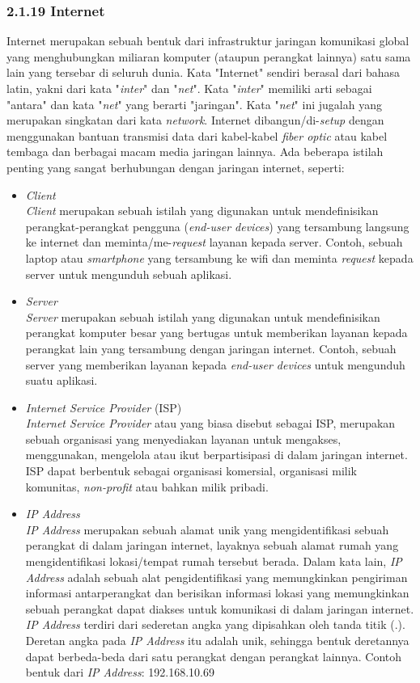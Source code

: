 \documentclass[a4paper]{article}
\newcommand{\subsubbab}[1]{%
    \subsubsection*{#1}%
    \addcontentsline{toc}{subsubsection}{\protect\numberline{}#1}%
}
\begin{document}
\subsubbab{2.1.19 Internet}
Internet merupakan sebuah bentuk dari infrastruktur jaringan komunikasi global yang menghubungkan miliaran komputer (ataupun perangkat lainnya) satu sama lain yang tersebar di seluruh dunia\autocite{javatpoint-internet}. Kata "Internet" sendiri berasal dari bahasa latin, yakni dari kata "\textit{inter}" dan "\textit{net}". Kata "\textit{inter}" memiliki arti sebagai "antara" dan kata "\textit{net}" yang berarti "jaringan". Kata "\textit{net}" ini jugalah yang merupakan singkatan dari kata \textit{network}\autocite{arti-kata-internet}. Internet dibangun/di-\textit{setup} dengan menggunakan bantuan transmisi data dari kabel-kabel \textit{fiber optic} atau kabel tembaga dan berbagai macam media jaringan lainnya\autocite{gfg-internet}. Ada beberapa istilah penting yang sangat berhubungan dengan jaringan internet, seperti:
\begin{itemize}
    \item \textit{Client}\\
    \textit{Client} merupakan sebuah istilah yang digunakan untuk mendefinisikan perangkat-perangkat pengguna (\textit{end-user devices}) yang tersambung langsung ke internet dan meminta/me-\textit{request} layanan kepada server. Contoh, sebuah laptop atau \textit{smartphone} yang tersambung ke wifi dan meminta \textit{request} kepada server untuk mengunduh sebuah aplikasi\autocite{arti-client-server}.
    \item \textit{Server}\\
    \textit{Server} merupakan sebuah istilah yang digunakan untuk mendefinisikan perangkat komputer besar yang bertugas untuk memberikan layanan kepada perangkat lain yang tersambung dengan jaringan internet. Contoh, sebuah server yang memberikan layanan kepada \textit{end-user devices} untuk mengunduh suatu aplikasi\autocite{arti-client-server}.
    \item \textit{Internet Service Provider} (ISP)\\
    \textit{Internet Service Provider} atau yang biasa disebut sebagai ISP, merupakan sebuah organisasi yang menyediakan layanan untuk mengakses, menggunakan, mengelola atau ikut berpartisipasi di dalam jaringan internet. ISP dapat berbentuk sebagai organisasi komersial, organisasi milik komunitas, \textit{non-profit} atau bahkan milik pribadi\autocite{what-is-isp}.
    \item \textit{IP Address}\\
    \textit{IP Address} merupakan sebuah alamat unik yang mengidentifikasi sebuah perangkat di dalam jaringan internet, layaknya sebuah alamat rumah yang mengidentifikasi lokasi/tempat rumah tersebut berada. Dalam kata lain, \textit{IP Address} adalah sebuah alat pengidentifikasi yang memungkinkan pengiriman informasi antarperangkat dan berisikan informasi lokasi yang memungkinkan sebuah perangkat dapat diakses untuk komunikasi di dalam jaringan internet\autocite{what-is-ip-address}. \textit{IP Address} terdiri dari sederetan angka yang dipisahkan oleh tanda titik (.). Deretan angka pada \textit{IP Address} itu adalah unik, sehingga bentuk deretannya dapat berbeda-beda dari satu perangkat dengan perangkat lainnya\autocite{javatpoint-internet}. Contoh bentuk dari \textit{IP Address}: 192.168.10.69

\end{itemize}
\end{document}
